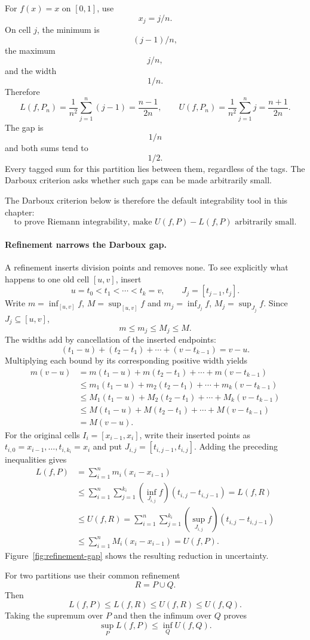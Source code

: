 \begin{example}
For $f(x)=x$ on $[0,1]$, use
\[
x_j=j/n.
\]
 On cell $j$, the minimum
is
\[
(j-1)/n,
\]
 the maximum
\[
j/n,
\]
 and the width
\[
1/n.
\]
 Therefore
\[
L(f,P_n)=\frac1{n^2}\sum_{j=1}^n(j-1)=\frac{n-1}{2n},\qquad
U(f,P_n)=\frac1{n^2}\sum_{j=1}^nj=\frac{n+1}{2n}.
\]
The gap is
\[
1/n
\]
 and both sums tend to
\[
1/2.
\]
 Every tagged sum for
this partition lies between them, regardless of the tags. The Darboux
criterion asks whether such gaps can be made arbitrarily small.
\end{example}

The Darboux criterion below is therefore the default integrability tool in
this chapter:
\[
\boxed{\text{to prove Riemann integrability, make }
U(f,P)-L(f,P)\text{ arbitrarily small}.}
\]
\paragraph{Refinement narrows the Darboux gap.}
A refinement inserts division points and removes none. To see explicitly
what happens to one old cell $[u,v]$, insert
\[
u=t_0<t_1<\cdots<t_k=v,
\qquad J_j=[t_{j-1},t_j].
\]
Write $m=\inf_{[u,v]}f$, $M=\sup_{[u,v]}f$ and
$m_j=\inf_{J_j}f$, $M_j=\sup_{J_j}f$. Since $J_j\subseteq[u,v]$,
\[
m\leq m_j\leq M_j\leq M.
\]
The widths add by cancellation of the inserted endpoints:
\[
(t_1-u)+(t_2-t_1)+\cdots+(v-t_{k-1})=v-u.
\]
Multiplying each bound by its corresponding positive width yields
\[
\begin{aligned}
m(v-u)
 &=m(t_1-u)+m(t_2-t_1)+\cdots+m(v-t_{k-1})\\
 &\leq m_1(t_1-u)+m_2(t_2-t_1)+\cdots+m_k(v-t_{k-1})\\
 &\leq M_1(t_1-u)+M_2(t_2-t_1)+\cdots+M_k(v-t_{k-1})\\
 &\leq M(t_1-u)+M(t_2-t_1)+\cdots+M(v-t_{k-1})\\
 &=M(v-u).
\end{aligned}
\]
For the original cells $I_i=[x_{i-1},x_i]$, write their inserted points as
$t_{i,0}=x_{i-1},\ldots,t_{i,k_i}=x_i$ and put
$J_{i,j}=[t_{i,j-1},t_{i,j}]$. Adding the preceding inequalities gives
\[
\begin{aligned}
L(f,P)&=\sum_{i=1}^n m_i(x_i-x_{i-1})\\
&\leq\sum_{i=1}^n\sum_{j=1}^{k_i}
 (\inf_{J_{i,j}}f)(t_{i,j}-t_{i,j-1})=L(f,R)\\
&\leq U(f,R)=\sum_{i=1}^n\sum_{j=1}^{k_i}
 (\sup_{J_{i,j}}f)(t_{i,j}-t_{i,j-1})\\
&\leq\sum_{i=1}^n M_i(x_i-x_{i-1})=U(f,P).
\end{aligned}
\]
Figure~\ref{fig:refinement-gap} shows the resulting reduction in uncertainty.

For two partitions use their common refinement
\[
R=P\cup Q.
\]
Then
\[
L(f,P)\leq L(f,R)\leq U(f,R)\leq U(f,Q).
\]
Taking the supremum over $P$ and then the infimum over $Q$ proves
\[
\sup_P L(f,P)\leq\inf_Q U(f,Q).
\]

